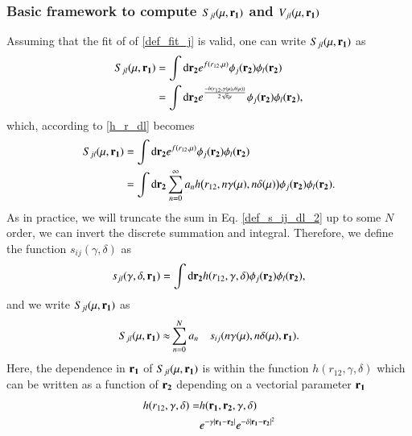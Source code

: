 \documentclass[aip,jcp,reprint,noshowkeys,superscriptaddress]{revtex4-1}
\newcommand{\bd}[1]{{\bf {#1}}}
\newcommand{\dr}[1]{\text{d}{\bf {#1}}}
\begin{document}
\subsubsection{Basic framework to compute $S_{jl}(\mu,\bd{r_1})$ and $V_{jl}(\mu,\bd{r_1})$}
Assuming that the fit of of \eqref{def_fit_j} is valid, one can write $S_{jl}(\mu,\bd{r_1})$ as 
\begin{equation}
 \label{def_s_ij_dl_1} 
 \begin{aligned}
 S_{jl}(\mu,\bd{r_1})& = \int \dr{r_2} e^{f(r_{12},\mu)} \phi_j(\bd{r_2}) \phi_l(\bd{r_2}) \\
                     & =\int \dr{r_2} e^{\frac{-h(r_{12},\gamma(\mu),\delta(\mu))}{2\sqrt{\pi}\mu}}  \phi_j(\bd{r_2}) \phi_l(\bd{r_2}), 
 \end{aligned}
\end{equation}
which, according to \eqref{h_r_dl} becomes 
\begin{equation}
 \label{def_s_ij_dl_2} 
 \begin{aligned}
 S_{jl}(\mu,\bd{r_1})& = \int \dr{r_2} e^{f(r_{12},\mu)} \phi_j(\bd{r_2}) \phi_l(\bd{r_2}) \\
                     & =\int \dr{r_2} 
 \sum_{n=0}^{\infty} a_n h\big( r_{12}, n\gamma(\mu),n\delta(\mu)\big)
 \phi_j(\bd{r_2}) \phi_l(\bd{r_2}).
 \end{aligned}
\end{equation}
As in practice, we will truncate the sum in Eq. \eqref{def_s_ij_dl_2} up to some $N$ order, we can invert the discrete summation and integral. Therefore, we define the function $s_{ij}(\gamma,\delta)$ as 
\begin{equation} 
 \label{def_s_ij_atom}
 s_{jl}(\gamma,\delta,\bd{r_1}) = \int \dr{r_2} h( r_{12}, \gamma,\delta) \phi_j(\bd{r_2}) \phi_l(\bd{r_2}), 
\end{equation} 
and we write $S_{jl}(\mu,\bd{r_1})$ as 
\begin{equation}
 \label{def_s_ij_dl_3} 
 \begin{aligned}
 S_{jl}(\mu,\bd{r_1}) \approx & \sum_{n=0}^{N}  a_n 
                     & s_{ij}(n  \gamma(\mu),n  \delta(\mu),\bd{r_1}).
 \end{aligned}
\end{equation}
Here, the dependence in $\bd{r_1}$ of $S_{jl}(\mu,\bd{r_1})$ is within the function $h( r_{12}, \gamma,\delta)$ which can be written as a function of $\bd{r_2}$ depending on a vectorial parameter $\bd{r_1}$
\begin{equation}
 \begin{aligned}
  h( r_{12}, \gamma,\delta) = & h(\bd{r_1},\bd{r_2},\gamma,\delta) \\
                              & e^{-\gamma |\bd{r_1} - \bd{r_2}|} e^{-\delta |\bd{r_1} - \bd{r_2}|^2} 
 \end{aligned}
\end{equation}
\end{document}
